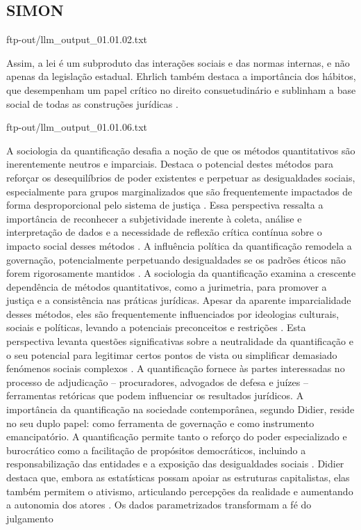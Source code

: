 
\begin{agradecimentos}
    \section{SIMON}

    ftp-out/llm_output_01.01.02.txt 
    
    Assim, a lei é um subproduto das interações sociais e das normas internas, e não apenas da legislação estadual. Ehrlich também destaca a importância dos hábitos, que desempenham um papel crítico no direito consuetudinário e sublinham a base social de todas as construções jurídicas \cite{venturini2024, venturini2024p24-25, venturini2024p22-23, venturini2024p18-19}. 
    
    ftp-out/llm_output_01.01.06.txt
    
    A sociologia da quantificação desafia a noção de que os métodos quantitativos são inerentemente neutros e imparciais. Destaca o potencial destes métodos para reforçar os desequilíbrios de poder existentes e perpetuar as desigualdades sociais, especialmente para grupos marginalizados que são frequentemente impactados de forma desproporcional pelo sistema de justiça \cite{10.5040/9781350220645,10.1080/07329113.2015.1046739}. Essa perspectiva ressalta a importância de reconhecer a subjetividade inerente à coleta, análise e interpretação de dados e a necessidade de reflexão crítica contínua sobre o impacto social desses métodos \cite{10.5040/9781350220645,10.1080/07329113.2015.1046739}. A influência política da quantificação remodela a governação, potencialmente perpetuando desigualdades se os padrões éticos não forem rigorosamente mantidos \cite{camargo2022}. A sociologia da quantificação examina a crescente dependência de métodos quantitativos, como a jurimetria, para promover a justiça e a consistência nas práticas jurídicas. Apesar da aparente imparcialidade desses métodos, eles são frequentemente influenciados por ideologias culturais, sociais e políticas, levando a potenciais preconceitos e restrições \cite{10.1057/s41599-020-00557-0,de2010jurimetrics,10.1177/09596801221075807}. Esta perspectiva levanta questões significativas sobre a neutralidade da quantificação e o seu potencial para legitimar certos pontos de vista ou simplificar demasiado fenómenos sociais complexos \cite{10.1111/ilr.12067,10.20396/rdbci.v18i0.8658889}. A quantificação fornece às partes interessadas no processo de adjudicação – procuradores, advogados de defesa e juízes – ferramentas retóricas que podem influenciar os resultados jurídicos. A importância da quantificação na sociedade contemporânea, segundo Didier, reside no seu duplo papel: como ferramenta de governação e como instrumento emancipatório. A quantificação permite tanto o reforço do poder especializado e burocrático como a facilitação de propósitos democráticos, incluindo a responsabilização das entidades e a exposição das desigualdades sociais \cite{demortain2019,didier2021,paiva2021}. Didier destaca que, embora as estatísticas possam apoiar as estruturas capitalistas, elas também permitem o ativismo, articulando percepções da realidade e aumentando a autonomia dos atores \cite{didier2021}. Os dados parametrizados transformam a fé do julgamento 
\end{agradecimentos}

